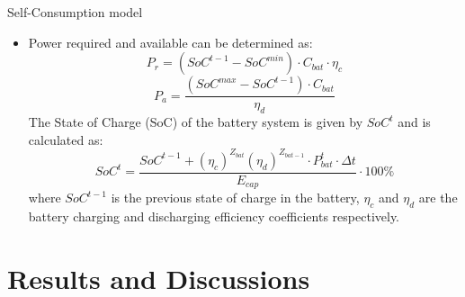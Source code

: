 \begin{frame}[c]{Self-Consumption model}

    \begin{itemize}
    
        \item Power required and available can be determined as:
    \begin{equation}
        P_r = (SoC^{t-1} - SoC^{min}) \cdot C_{bat} \cdot \eta_c
    \end{equation}
    \begin{equation}
        P_a = \frac{(SoC^{max} - SoC^{t-1}) \cdot C_{bat}}{\eta_d}
    \end{equation}
    The State of Charge (SoC) of the battery system is given by \(SoC^t\) and is calculated as:
        \begin{equation}
            SoC^t = \frac{SoC^{t-1} + (\eta_c)^{Z_{bat}}(\eta_d)^{Z_{bat-1}}\cdot P_{bat}^t \cdot\Delta t}{E_{cap}} \cdot 100\%
        \end{equation}
        where \(SoC^{t-1}\) is the previous state of charge in the battery, \(\eta_c\) and \(\eta_d\) are the battery charging and
        discharging efficiency coefficients respectively. 
    \end{itemize}
\end{frame}



\section{Results and Discussions}

